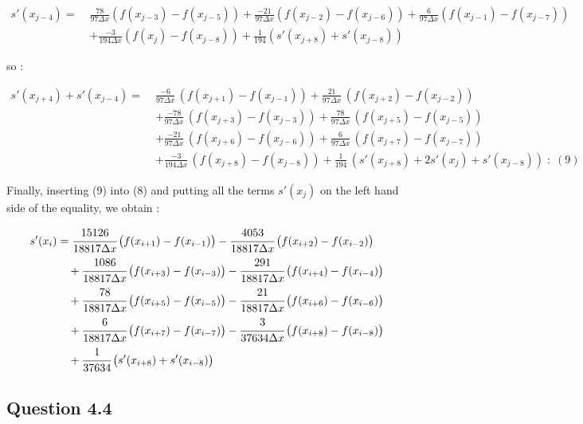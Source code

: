 \documentclass[10pt]{article}
\begin{document}
\begin{align*}
s'(x_{j-4}) = \; & \frac{78}{97 \Delta x} (f(x_{j-3}) - f(x_{j-5}))+ \frac{-21}{97 \Delta x} (f(x_{j-2}) - f(x_{j-6})) + \frac{6}{97 \Delta x} (f(x_{j-1}) - f(x_{j-7})) \\
& + \frac{-3}{194 \Delta x} (f(x_{j}) - f(x_{j-8}))+ \frac{1}{194} \left(s'(x_{j+8})+s'(x_{j-8}) \right)
\end{align*}

so :

\begin{align*}
s'(x_{j+4}) +s'(x_{j-4}) = \; & \frac{-6}{97 \Delta x}\, (f(x_{j+1}) - f(x_{j-1}))+  \frac{21}{97 \Delta x}\, (f(x_{j+2}) - f(x_{j-2})) \\
& + \frac{-78}{97 \Delta x}\, (f(x_{j+3}) - f(x_{j-3}))+  \frac{78}{97 \Delta x}\, (f(x_{j+5}) - f(x_{j-5})) \\
& + \frac{-21}{97 \Delta x}\, (f(x_{j+6}) - f(x_{j-6}))+  \frac{6}{97 \Delta x}\, (f(x_{j+7}) - f(x_{j-7})) \\
& + \frac{-3}{194 \Delta x}\, (f(x_{j+8}) - f(x_{j-8}))+ \frac{1}{194}\, \left(s'(x_{j+8})+ 2 s'(x_j) +s'(x_{j-8}) \right) \;:\;(9)
\end{align*}


Finally, inserting (9) into (8) and putting all the terms $s'(x_j)$ on the left hand side of the equality, we obtain : 

\begin{align*}
\begin{split}
s'(x_{i}) &= \cfrac{15126}{18817\Delta x}\,\big(f(x_{i+1})-f(x_{i-1})\big) - \cfrac{4053}{18817\Delta x}\,\big(f(x_{i+2})-f(x_{i-2})\big) \\
&\quad + \cfrac{1086}{18817\Delta x}\,\big(f(x_{i+3})-f(x_{i-3})\big) - \cfrac{291}{18817\Delta x}\,\big(f(x_{i+4})-f(x_{i-4})\big) \\
&\quad + \cfrac{78}{18817\Delta x}\,\big(f(x_{i+5})-f(x_{i-5})\big) - \cfrac{21}{18817\Delta x}\,\big(f(x_{i+6})-f(x_{i-6})\big) \\
&\quad + \cfrac{6}{18817\Delta x}\,\big(f(x_{i+7})-f(x_{i-7})\big) - \cfrac{3}{37634\Delta x}\,\big(f(x_{i+8})-f(x_{i-8})\big) \\
&\quad + \cfrac{1}{37634}\,\big(s'(x_{i+8})+s'(x_{i-8})\big) \, 
\end{split}
\end{align*}


\subsection{Question 4.4}
\end{document}
